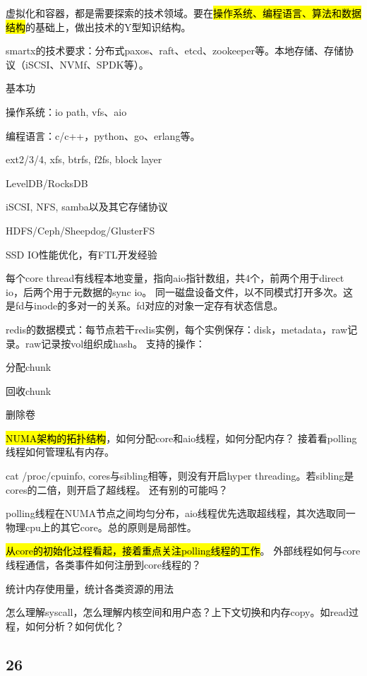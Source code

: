 虚拟化和容器，都是需要探索的技术领域。要在\hl{操作系统、编程语言、算法和数据结构}的基础上，做出技术的Y型知识结构。

smartx的技术要求：分布式paxos、raft、etcd、zookeeper等。本地存储、存储协议（iSCSI、NVMf、SPDK等）。

基本功
\begin{enumbox}
\item 操作系统：io path, vfs、aio
\item 编程语言：c/c++，python、go、erlang等。
\item ext2/3/4, xfs, btrfs, f2fs, block layer
\item LevelDB/RocksDB
\item iSCSI, NFS, samba以及其它存储协议
\item HDFS/Ceph/Sheepdog/GlusterFS
\item SSD IO性能优化，有FTL开发经验
\end{enumbox}

每个core thread有线程本地变量，指向aio指针数组，共4个，前两个用于direct io，后两个用于元数据的sync io。
同一磁盘设备文件，以不同模式打开多次。这是fd与inode的多对一的关系。fd对应的对象一定存有状态信息。

redis的数据模式：每节点若干redis实例，每个实例保存：disk，metadata，raw记录。raw记录按vol组织成hash。
支持的操作：
\begin{enumbox}
\item 分配chunk
\item 回收chunk
\item 删除卷
\end{enumbox}

\hl{NUMA架构的拓扑结构}，如何分配core和aio线程，如何分配内存？
接着看polling线程如何管理私有内存。

cat /proc/cpuinfo, cores与sibling相等，则没有开启hyper threading。若sibling是cores的二倍，则开启了超线程。
还有别的可能吗？

polling线程在NUMA节点之间均匀分布，aio线程优先选取超线程，其次选取同一物理cpu上的其它core。总的原则是局部性。

\hl{从core的初始化过程看起，接着重点关注polling线程的工作}。
外部线程如何与core线程通信，各类事件如何注册到core线程的？

统计内存使用量，统计各类资源的用法

怎么理解syscall，怎么理解内核空间和用户态？上下文切换和内存copy。如read过程，如何分析？如何优化？

\subsection{26}
